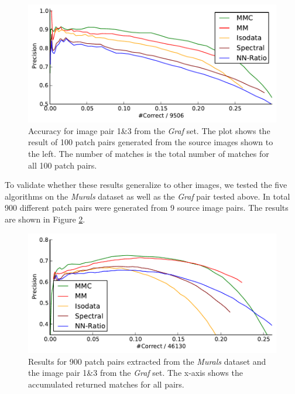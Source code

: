 \documentclass[conference]{IEEEtran}
\begin{document}
\begin{figure}[htb]
			\centering
            \includegraphics[width=0.8\columnwidth]{images/result_graf}
	\caption{Accuracy for image pair 1\&3 from the \emph{Graf} set. The plot 
		shows the result of 100 patch pairs generated from the source 
		images shown to the left. The number of matches is the total 
		number of matches for all 100 patch pairs.}
	\label{fig:result_graf}
\end{figure}

To validate whether these results generalize to other images, we tested 
the five algorithms on the \emph{Murals} dataset as well as the 
\emph{Graf} pair tested above.  In total 900 different patch pairs were 
generated from 9 source image pairs.  The results are shown in Figure 
\ref{fig:result_accumulated}. 

\begin{figure}[htb]
	\centering
    \includegraphics[width=0.8\columnwidth]{images/result_accumulated}
	\caption{Results for 900 patch pairs extracted from the \emph{Murals} dataset and the image pair 1\&3 from the \emph{Graf} set.  The x-axis shows the accumulated returned matches for all pairs.}
	\label{fig:result_accumulated}
\end{figure}
\end{document}
